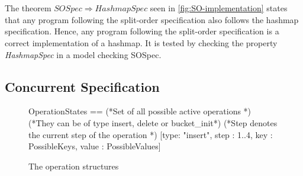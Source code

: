 \documentclass{uit-thesis}
\begin{document}
\\\\
The theorem $SOSpec \Rightarrow HashmapSpec$ seen in \autoref{fig:SO-implementation} states that any program following the split-order specification also follows the hashmap specification. Hence, any program following the split-order specification is a correct implementation of a hashmap. It is tested by checking the property \textit{HashmapSpec} in a model checking SOSpec.

\subsection{Concurrent Specification}
\begin{figure}
    \begin{tla}
OperationStates ==
    (*Set of all possible active operations            *)
    (*They can be of type insert, delete or bucket\_init*)
    (*Step denotes the current step of the operation   *)
    [type: {"insert"}, step : 1..4, key : PossibleKeys, value : PossibleValues]
    \end{tla}
\begin{tlatex}
%
%
%
\@xx{}%
%
%
\@xx{}%
%
%
\@xx{}%
%
%
\end{tlatex}
    \caption{The operation structures}
    \label{fig:op-structure}
\end{figure}
\end{document}
